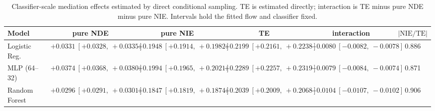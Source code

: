 \begin{table}[htbp]
  \centering
  \caption{Classifier-scale mediation effects estimated by direct conditional sampling. TE is estimated directly; interaction is TE minus pure NDE minus pure NIE. Intervals hold the fitted flow and classifier fixed.}
  \label{tab:german_synth_gap_overall}
  \begin{tabular}{lccccc}
    \toprule
    Model & pure NDE & pure NIE & TE & interaction & $|\mathrm{NIE}/\mathrm{TE}|$ \\
    \midrule
    Logistic Reg. & $+0.0331\ [+0.0328,\ +0.0335]$ & $+0.1948\ [+0.1914,\ +0.1982]$ & $+0.2199\ [+0.2161,\ +0.2238]$ & $-0.0080\ [-0.0082,\ -0.0078]$ & 0.886 \\
    MLP (64--32) & $+0.0374\ [+0.0368,\ +0.0380]$ & $+0.1994\ [+0.1965,\ +0.2021]$ & $+0.2289\ [+0.2257,\ +0.2319]$ & $-0.0079\ [-0.0084,\ -0.0074]$ & 0.871 \\
    Random Forest & $+0.0296\ [+0.0291,\ +0.0301]$ & $+0.1847\ [+0.1819,\ +0.1874]$ & $+0.2039\ [+0.2009,\ +0.2068]$ & $-0.0104\ [-0.0107,\ -0.0102]$ & 0.906 \\
    \bottomrule
  \end{tabular}
\end{table}